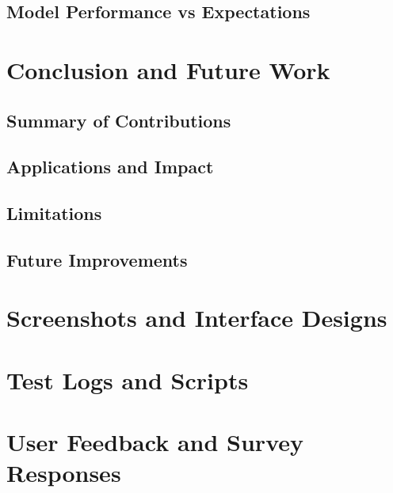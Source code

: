 \documentclass[12pt,a4paper]{report}
\begin{document}
\section{Model Performance vs Expectations}

\chapter{Conclusion and Future Work}  %
\section{Summary of Contributions}
\section{Applications and Impact}
\section{Limitations}
\section{Future Improvements}

\appendix
\chapter{Screenshots and Interface Designs}
\chapter{Test Logs and Scripts}
\chapter{User Feedback and Survey Responses}

\end{document}
